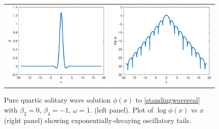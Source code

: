 \documentclass[12pt]{article}
\begin{document}
\begin{figure}[H]
\centering
\begin{tabular}{cc}
\includegraphics[width=8cm]{images/PQS1.eps} &
\includegraphics[width=8cm]{images/PQS1log.eps}
\end{tabular}
\caption{Pure quartic solitary wave solution $\phi(x)$ to \cref{standingwavereal} with $\beta_2 = 0$, $\beta_4 = -1$, $\omega = 1$. (left panel). Plot of $\log \phi(x)$ vs $x$ (right panel) showing exponentially-decaying oscillatory tails. }
\label{fig:PQS}
\end{figure} 
\end{document}
